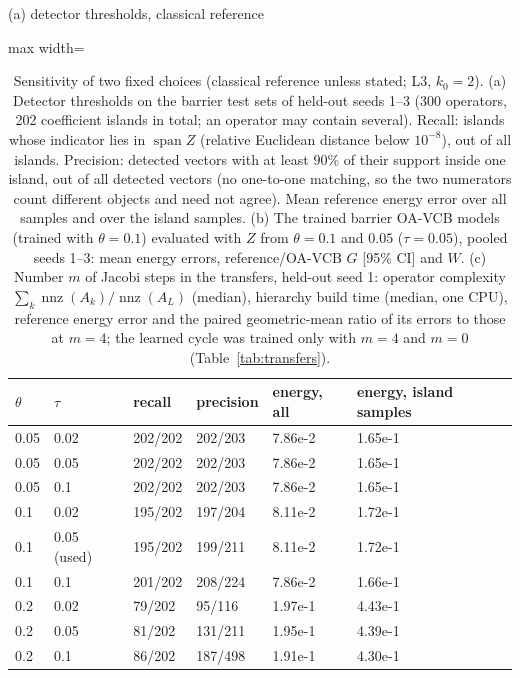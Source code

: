 \begin{table}[tbp]\centering\footnotesize\setlength{\tabcolsep}{4pt}
\caption{Sensitivity of two fixed choices (classical reference unless stated; L3, $k_0=2$). (a) Detector thresholds on the barrier test sets of held-out seeds 1--3 (300 operators, 202 coefficient islands in total; an operator may contain several). Recall: islands whose indicator lies in $\operatorname{span}Z$ (relative Euclidean distance below $10^{-8}$), out of all islands. Precision: detected vectors with at least $90\%$ of their support inside one island, out of all detected vectors (no one-to-one matching, so the two numerators count different objects and need not agree). Mean reference energy error over all samples and over the island samples. (b) The trained barrier OA-VCB models (trained with $\theta=0.1$) evaluated with $Z$ from $\theta=0.1$ and $0.05$ ($\tau=0.05$), pooled seeds 1--3: mean energy errors, reference/OA-VCB $G$ [95\% CI] and $W$. (c) Number $m$ of Jacobi steps in the transfers, held-out seed 1: operator complexity $\sum_k\operatorname{nnz}(A_k)/\operatorname{nnz}(A_L)$ (median), hierarchy build time (median, one CPU), reference energy error and the paired geometric-mean ratio of its errors to those at $m=4$; the learned cycle was trained only with $m=4$ and $m=0$ (Table~\ref{tab:transfers}).}\label{tab:sensitivity}
{\small (a) detector thresholds, classical reference}\par\smallskip
\begin{adjustbox}{max width=\linewidth}
\begin{tabular}{llllll}\toprule
$\theta$ & $\tau$ & recall & precision & energy, all & energy, island samples \\\midrule
0.05 & 0.02 & 202/202 & 202/203 & 7.86e-2 & 1.65e-1 \\
0.05 & 0.05 & 202/202 & 202/203 & 7.86e-2 & 1.65e-1 \\
0.05 & 0.1 & 202/202 & 202/203 & 7.86e-2 & 1.65e-1 \\
0.1 & 0.02 & 195/202 & 197/204 & 8.11e-2 & 1.72e-1 \\
0.1 & 0.05 (used) & 195/202 & 199/211 & 8.11e-2 & 1.72e-1 \\
0.1 & 0.1 & 201/202 & 208/224 & 7.86e-2 & 1.66e-1 \\
0.2 & 0.02 & 79/202 & 95/116 & 1.97e-1 & 4.43e-1 \\
0.2 & 0.05 & 81/202 & 131/211 & 1.95e-1 & 4.39e-1 \\
0.2 & 0.1 & 86/202 & 187/498 & 1.91e-1 & 4.30e-1 \\

\end{tabular}
\end{adjustbox}
\end{table}

